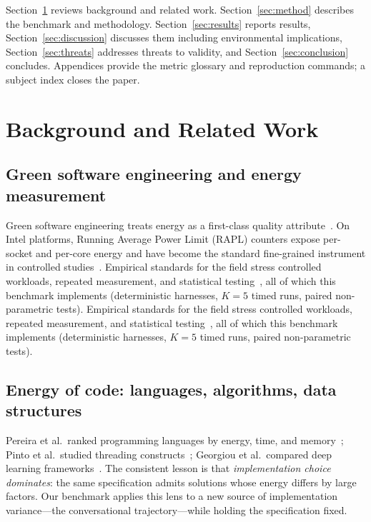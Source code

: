\documentclass[journal]{IEEEtran}
\begin{document}
Section~\ref{sec:related} reviews background and related work.
Section~\ref{sec:method} describes the benchmark and methodology.
Section~\ref{sec:results} reports results, Section~\ref{sec:discussion}
discusses them including environmental implications,
Section~\ref{sec:threats} addresses threats to validity, and
Section~\ref{sec:conclusion} concludes. Appendices provide the metric
glossary and reproduction commands; a subject index closes the paper.

\section{Background and Related Work}\label{sec:related}
\subsection{Green software engineering and energy measurement}
Green software engineering treats energy as a first-class quality
attribute~\cite{calero2015, hindle2023}. On Intel platforms, Running Average
Power Limit (RAPL) counters expose per-socket and per-core energy and have
become the standard fine-grained instrument in controlled
studies~\cite{rotem2012, hahnell2012, hackenberg2013, david2010}. Empirical
standards for the field stress controlled workloads, repeated measurement,
and statistical testing~\cite{ralph2021, wohlin2012}, all of which this
benchmark implements (deterministic harnesses, $K{=}5$ timed runs, paired
non-parametric tests). Empirical
standards for the field stress controlled workloads, repeated measurement,
and statistical testing~\cite{ralph2021, wohlin2012}, all of which this
benchmark implements (deterministic harnesses, $K{=}5$ timed runs, paired
non-parametric tests).

\subsection{Energy of code: languages, algorithms, data structures}
Pereira et al.\ ranked programming languages by energy, time, and
memory~\cite{pereira2017}; Pinto et al.\ studied threading
constructs~\cite{pinto2014, pinto2014b}; Georgiou et al.\ compared deep
learning frameworks~\cite{georgiou2022}. The consistent lesson is that
\emph{implementation choice dominates}: the same specification admits
solutions whose energy differs by large factors. Our benchmark applies this
lens to a new source of implementation variance---the conversational
trajectory---while holding the specification fixed.
\end{document}
